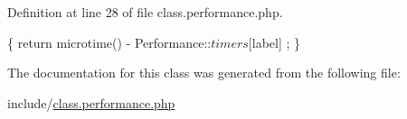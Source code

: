 Definition at line 28 of file class.\-performance.\-php.


\begin{DoxyCode}
                                                   \{
                              \textcolor{keywordflow}{return} microtime() - Performance::$timers[$label]
      ;
               \}
\end{DoxyCode}


The documentation for this class was generated from the following file\-:\begin{DoxyCompactItemize}
\item 
include/\hyperlink{class_8performance_8php}{class.\-performance.\-php}\end{DoxyCompactItemize}
